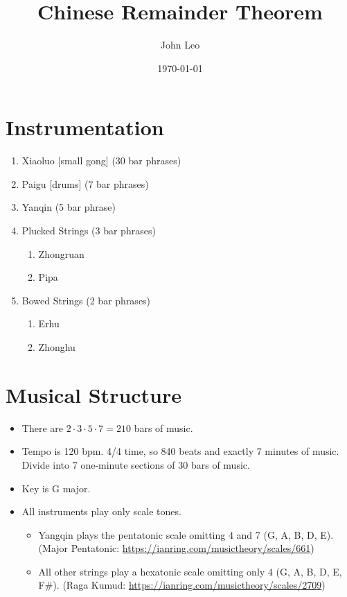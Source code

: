 \documentclass[12pt]{article}
\title{Chinese Remainder Theorem}
\author{John Leo}
\date{\today}
\begin{document}
\maketitle

\section{Instrumentation}

\begin{enumerate}
\item Xiaoluo [small gong] (30 bar phrases)
\item Paigu [drums] (7 bar phrases)
\item Yanqin (5 bar phrase)
\item Plucked Strings (3 bar phrases)
  \begin{enumerate}
  \item Zhongruan
  \item Pipa
  \end{enumerate}
\item Bowed Strings (2 bar phrases)
  \begin{enumerate}
  \item Erhu
  \item Zhonghu
  \end{enumerate}
\end{enumerate}

\section{Musical Structure}

\begin{itemize}
\item There are $2\cdot 3\cdot 5\cdot 7 = 210$ bars of music.

\item Tempo is 120 bpm. 4/4 time, so 840 beats and exactly 7 minutes of music.
Divide into 7 one-minute sections of 30 bars of music.

\item Key is G major.

\item All instruments play only scale tones.

\begin{itemize}
\item Yangqin plays the pentatonic scale omitting 4 and 7 (G, A, B, D, E).
\linebreak(Major Pentatonic: 
\href{https://ianring.com/musictheory/scales/661}{https://ianring.com/musictheory/scales/661})

\item All other strings play a hexatonic scale omitting only 4 (G, A, B, D,
E, F\#). \linebreak(Raga Kumud:
\href{https://ianring.com/musictheory/scales/2709}{https://ianring.com/musictheory/scales/2709})
\end{itemize}
\end{itemize}
\end{document}
